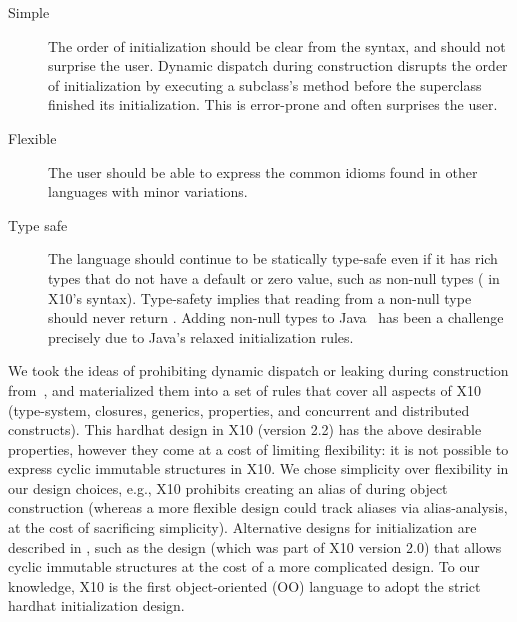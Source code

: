 \begin{description}

  \item[Simple]
    The order of initialization should be clear from the syntax, %
        and should not surprise the user.
    Dynamic dispatch during construction disrupts the order
        of initialization by executing a subclass's method before the superclass finished its initialization.
    This is error-prone and often surprises the user.

  \item[Flexible]
    The user should be able to express the common idioms
        found in other languages with minor variations.

  \item[Type safe]
    The language should continue to be statically type-safe even
        if it has rich types that do not have a default or zero value,
        such as non-null types ( in X10's syntax).
    Type-safety implies that reading from a non-null type should never return .
    Adding non-null types to Java~\cite{Fahndrich:2003:DCN:949305.949332,Fahndrich:2007:EOI:1297027.1297052,XinQi:2009}
        has been a challenge precisely due to
        Java's relaxed initialization rules.
\end{description}

We took the ideas of prohibiting dynamic dispatch or leaking \this during construction from~\cite{Gil:2009:WRS:1615184.1615216},
    and materialized them into a set of rules that cover all aspects of X10
    (type-system, closures, generics, properties, and concurrent and distributed constructs).
This hardhat design in X10 (version 2.2) has the above desirable properties,
    however they come at a cost of limiting flexibility:
    it is not possible to express cyclic immutable structures in X10.
We chose simplicity over flexibility in our design choices, e.g.,
    X10 prohibits creating an alias of \this during object construction
    (whereas a more flexible design could track aliases via alias-analysis, at the cost of sacrificing simplicity).
Alternative designs for initialization are described in ,
    such as the  design (which was part of X10 version 2.0) that allows cyclic immutable structures
    at the cost of a more complicated design.
To our knowledge, X10 is the first object-oriented (OO) language to adopt the strict hardhat initialization design.

